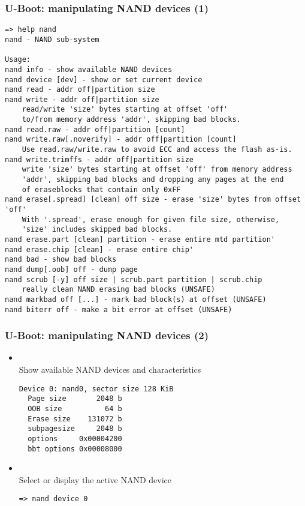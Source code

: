 \begin{frame}[fragile]
  \frametitle{U-Boot: manipulating NAND devices (1)}
  \begin{block}{}
  \tiny
  \begin{verbatim}
=> help nand
nand - NAND sub-system

Usage:
nand info - show available NAND devices
nand device [dev] - show or set current device
nand read - addr off|partition size
nand write - addr off|partition size
    read/write 'size' bytes starting at offset 'off'
    to/from memory address 'addr', skipping bad blocks.
nand read.raw - addr off|partition [count]
nand write.raw[.noverify] - addr off|partition [count]
    Use read.raw/write.raw to avoid ECC and access the flash as-is.
nand write.trimffs - addr off|partition size
    write 'size' bytes starting at offset 'off' from memory address
    'addr', skipping bad blocks and dropping any pages at the end
    of eraseblocks that contain only 0xFF
nand erase[.spread] [clean] off size - erase 'size' bytes from offset 'off'
    With '.spread', erase enough for given file size, otherwise,
    'size' includes skipped bad blocks.
nand erase.part [clean] partition - erase entire mtd partition'
nand erase.chip [clean] - erase entire chip'
nand bad - show bad blocks
nand dump[.oob] off - dump page
nand scrub [-y] off size | scrub.part partition | scrub.chip
    really clean NAND erasing bad blocks (UNSAFE)
nand markbad off [...] - mark bad block(s) at offset (UNSAFE)
nand biterr off - make a bit error at offset (UNSAFE)
  \end{verbatim}
  \end{block}
\end{frame}


\begin{frame}[fragile]
  \frametitle{U-Boot: manipulating NAND devices (2)}
  \begin{itemize}
  \item {}\\
    Show available NAND devices and characteristics
    \begin{block}{}
    \footnotesize
    \begin{verbatim}
Device 0: nand0, sector size 128 KiB
  Page size       2048 b
  OOB size          64 b
  Erase size    131072 b
  subpagesize     2048 b
  options     0x00004200
  bbt options 0x00008000
    \end{verbatim}
    \end{block}
  \item {}\\
    Select or display the active NAND device
    \begin{block}{}
    \footnotesize
    \begin{verbatim}
=> nand device 0
    \end{verbatim}
    \end{block}
  \end{itemize}
\end{frame}

